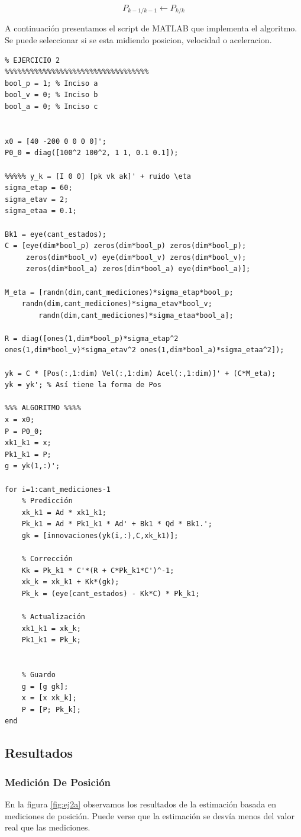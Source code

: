 				\begin{equation*}
					P_{k - 1/k - 1} \leftarrow P_{k/k}
				\end{equation*}
	
	A continuación presentamos el script de MATLAB que implementa el algoritmo. Se puede seleccionar si se esta midiendo posicion, velocidad o aceleracion.

	\begin{lstlisting}[caption=\emph{Script} para la resolución del ejercicio 2]
%%%%%%%%%%%%%%%%%%%%%%%%%%%%%%%%%%
% EJERCICIO 2
%%%%%%%%%%%%%%%%%%%%%%%%%%%%%%%%%%
bool_p = 1;	% Inciso a
bool_v = 0;	% Inciso b
bool_a = 0;	% Inciso c


x0 = [40 -200 0 0 0 0]';
P0_0 = diag([100^2 100^2, 1 1, 0.1 0.1]);

%%%%% y_k = [I 0 0] [pk vk ak]' + ruido \eta
sigma_etap = 60;
sigma_etav = 2;
sigma_etaa = 0.1;

Bk1 = eye(cant_estados);
C =	[eye(dim*bool_p) zeros(dim*bool_p) zeros(dim*bool_p);
	 zeros(dim*bool_v) eye(dim*bool_v) zeros(dim*bool_v);
	 zeros(dim*bool_a) zeros(dim*bool_a) eye(dim*bool_a)];

M_eta = [randn(dim,cant_mediciones)*sigma_etap*bool_p; 
	randn(dim,cant_mediciones)*sigma_etav*bool_v;
       	randn(dim,cant_mediciones)*sigma_etaa*bool_a];

R = diag([ones(1,dim*bool_p)*sigma_etap^2 ones(1,dim*bool_v)*sigma_etav^2 ones(1,dim*bool_a)*sigma_etaa^2]);

yk = C * [Pos(:,1:dim) Vel(:,1:dim) Acel(:,1:dim)]' + (C*M_eta);
yk = yk'; % Así tiene la forma de Pos

%%% ALGORITMO %%%%
x = x0;
P = P0_0;
xk1_k1 = x;
Pk1_k1 = P;
g = yk(1,:)';

for i=1:cant_mediciones-1
	% Predicción
	xk_k1 = Ad * xk1_k1;
	Pk_k1 =	Ad * Pk1_k1 * Ad' + Bk1 * Qd * Bk1.';
	gk = [innovaciones(yk(i,:),C,xk_k1)];

	% Corrección
	Kk = Pk_k1 * C'*(R + C*Pk_k1*C')^-1;
	xk_k = xk_k1 + Kk*(gk);
	Pk_k = (eye(cant_estados) - Kk*C) * Pk_k1;
	
	% Actualización
	xk1_k1 = xk_k;
	Pk1_k1 = Pk_k;


	% Guardo
	g = [g gk];
	x = [x xk_k];
	P = [P; Pk_k];
end
	\end{lstlisting}
	
	\subsection{Resultados}
		\subsubsection{Medición De Posición}
			En la figura \ref{fig:ej2a} observamos los resultados de la estimación basada en mediciones de posición. Puede verse que la estimación se desvía menos del valor real que las mediciones.

